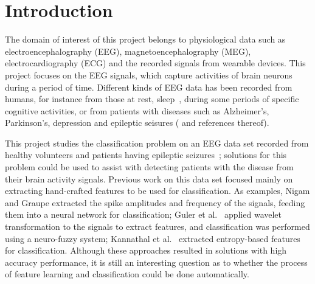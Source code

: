\documentclass[12pt]{article}
\begin{document}
\maketitle

\section{Introduction}
\noindent
The domain of interest of this project belongs to physiological data such as electroencephalography (EEG), magnetoencephalography (MEG), electrocardiography (ECG) and the recorded signals from wearable devices. This project focuses on the EEG signals, which capture activities of brain neurons during a period of time. Different kinds of EEG data has been recorded from humans, for instance from those at rest, sleep~\cite{langkvist2012sleep}, during some periods of specific cognitive activities, or from patients with diseases such as Alzheimer's, Parkinson's, depression and epileptic seisures (\cite{andrzejak2001indications} and references thereof).

This project studies the classification problem on an EEG data set recorded from healthy volunteers and patients having epileptic seizures~\cite{andrzejak2001indications}; solutions for this problem could be used to assist with detecting patients with the disease from their brain activity signals. Previous work on this data set focused mainly on extracting hand-crafted features to be used for classification. As examples, Nigam and Graupe \cite{nigam2004neural} extracted the spike amplitudes and frequency of the signals, feeding them into a neural network for classification; Guler et al.~\cite{guler2005recurrent} applied wavelet transformation to the signals to extract features, and classification was performed using a neuro-fuzzy system; Kannathal et al.~\cite{kannathal2005entropies} extracted entropy-based features for classification. Although these approaches resulted in solutions with high accuracy performance, it is still an interesting question as to whether the process of feature learning and classification could be done automatically.
\end{document}
